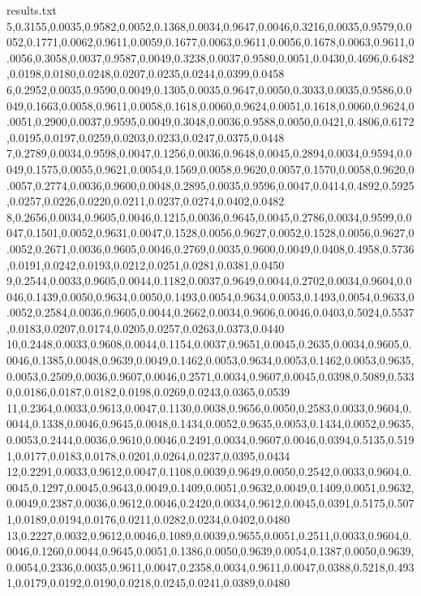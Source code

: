 \begin{filecontents*}{results.txt}
5,0.3155,0.0035,0.9582,0.0052,0.1368,0.0034,0.9647,0.0046,0.3216,0.0035,0.9579,0.0052,0.1771,0.0062,0.9611,0.0059,0.1677,0.0063,0.9611,0.0056,0.1678,0.0063,0.9611,0.0056,0.3058,0.0037,0.9587,0.0049,0.3238,0.0037,0.9580,0.0051,0.0430,0.4696,0.6482,0.0198,0.0180,0.0248,0.0207,0.0235,0.0244,0.0399,0.0458
6,0.2952,0.0035,0.9590,0.0049,0.1305,0.0035,0.9647,0.0050,0.3033,0.0035,0.9586,0.0049,0.1663,0.0058,0.9611,0.0058,0.1618,0.0060,0.9624,0.0051,0.1618,0.0060,0.9624,0.0051,0.2900,0.0037,0.9595,0.0049,0.3048,0.0036,0.9588,0.0050,0.0421,0.4806,0.6172,0.0195,0.0197,0.0259,0.0203,0.0233,0.0247,0.0375,0.0448
7,0.2789,0.0034,0.9598,0.0047,0.1256,0.0036,0.9648,0.0045,0.2894,0.0034,0.9594,0.0049,0.1575,0.0055,0.9621,0.0054,0.1569,0.0058,0.9620,0.0057,0.1570,0.0058,0.9620,0.0057,0.2774,0.0036,0.9600,0.0048,0.2895,0.0035,0.9596,0.0047,0.0414,0.4892,0.5925,0.0257,0.0226,0.0220,0.0211,0.0237,0.0274,0.0402,0.0482
8,0.2656,0.0034,0.9605,0.0046,0.1215,0.0036,0.9645,0.0045,0.2786,0.0034,0.9599,0.0047,0.1501,0.0052,0.9631,0.0047,0.1528,0.0056,0.9627,0.0052,0.1528,0.0056,0.9627,0.0052,0.2671,0.0036,0.9605,0.0046,0.2769,0.0035,0.9600,0.0049,0.0408,0.4958,0.5736,0.0191,0.0242,0.0193,0.0212,0.0251,0.0281,0.0381,0.0450
9,0.2544,0.0033,0.9605,0.0044,0.1182,0.0037,0.9649,0.0044,0.2702,0.0034,0.9604,0.0046,0.1439,0.0050,0.9634,0.0050,0.1493,0.0054,0.9634,0.0053,0.1493,0.0054,0.9633,0.0052,0.2584,0.0036,0.9605,0.0044,0.2662,0.0034,0.9606,0.0046,0.0403,0.5024,0.5537,0.0183,0.0207,0.0174,0.0205,0.0257,0.0263,0.0373,0.0440
10,0.2448,0.0033,0.9608,0.0044,0.1154,0.0037,0.9651,0.0045,0.2635,0.0034,0.9605,0.0046,0.1385,0.0048,0.9639,0.0049,0.1462,0.0053,0.9634,0.0053,0.1462,0.0053,0.9635,0.0053,0.2509,0.0036,0.9607,0.0046,0.2571,0.0034,0.9607,0.0045,0.0398,0.5089,0.5330,0.0186,0.0187,0.0182,0.0198,0.0269,0.0243,0.0365,0.0539
11,0.2364,0.0033,0.9613,0.0047,0.1130,0.0038,0.9656,0.0050,0.2583,0.0033,0.9604,0.0044,0.1338,0.0046,0.9645,0.0048,0.1434,0.0052,0.9635,0.0053,0.1434,0.0052,0.9635,0.0053,0.2444,0.0036,0.9610,0.0046,0.2491,0.0034,0.9607,0.0046,0.0394,0.5135,0.5191,0.0177,0.0183,0.0178,0.0201,0.0264,0.0237,0.0395,0.0434
12,0.2291,0.0033,0.9612,0.0047,0.1108,0.0039,0.9649,0.0050,0.2542,0.0033,0.9604,0.0045,0.1297,0.0045,0.9643,0.0049,0.1409,0.0051,0.9632,0.0049,0.1409,0.0051,0.9632,0.0049,0.2387,0.0036,0.9612,0.0046,0.2420,0.0034,0.9612,0.0045,0.0391,0.5175,0.5071,0.0189,0.0194,0.0176,0.0211,0.0282,0.0234,0.0402,0.0480
13,0.2227,0.0032,0.9612,0.0046,0.1089,0.0039,0.9655,0.0051,0.2511,0.0033,0.9604,0.0046,0.1260,0.0044,0.9645,0.0051,0.1386,0.0050,0.9639,0.0054,0.1387,0.0050,0.9639,0.0054,0.2336,0.0035,0.9611,0.0047,0.2358,0.0034,0.9611,0.0047,0.0388,0.5218,0.4931,0.0179,0.0192,0.0190,0.0218,0.0245,0.0241,0.0389,0.0480

\end{filecontents*}

